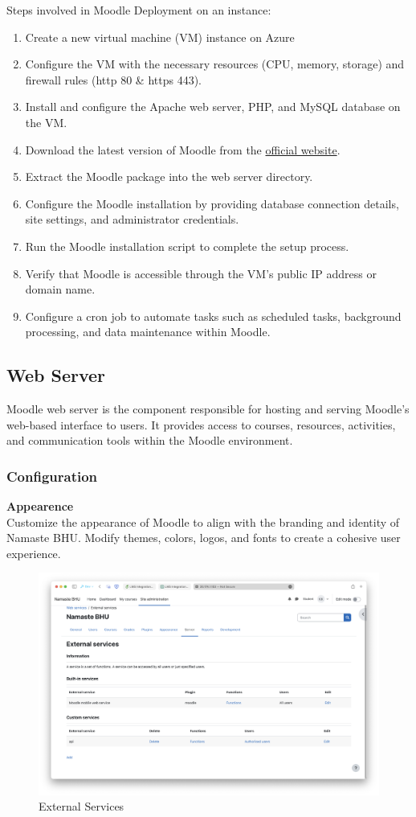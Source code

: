 Steps involved in Moodle Deployment on an instance:
\begin{enumerate}
    \item Create a new virtual machine (VM) instance on Azure
    \item Configure the VM with the necessary resources (CPU, memory, storage) and firewall rules (http 80 \& https 443).
    \item Install and configure the Apache web server, PHP, and MySQL database on the VM.
    \item Download the latest version of Moodle from the \href{https://moodle.org}{official website}.
    \item Extract the Moodle package into the web server directory.
    \item Configure the Moodle installation by providing database connection details, site settings, and administrator credentials.
    \item Run the Moodle installation script to complete the setup process.
    \item Verify that Moodle is accessible through the VM's public IP address or domain name.
    \item Configure a cron job to automate tasks such as scheduled tasks, background processing, and data maintenance within Moodle.
\end{enumerate}

\subsection{Web Server}
Moodle web server is the component responsible for hosting and serving Moodle's web-based interface to users. It provides access to courses, resources, activities, and communication tools within the Moodle environment.

\subsubsection*{Configuration}

\textbf{Appearence}\\
Customize the appearance of Moodle to align with the branding and identity of Namaste BHU. Modify themes, colors, logos, and fonts to create a cohesive user experience.

\begin{figure}[H]
    \centering
    \includegraphics[width=0.75\linewidth]{assets/img/external-services.png}
    \caption{External Services}
    \label{fig:external-services}
\end{figure}

